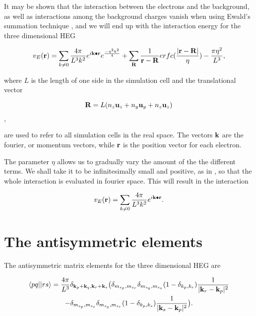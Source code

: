 It may be shown that the interaction between the electrons and the background, as well as interactions among the background charges vanish when using Ewald's summation technique \cite{Fraser1996}, and we will end up with the interaction energy for the three dimensional HEG \cite{Drummond2008}

\begin{equation}
v_{E}(\bold{r}) = \sum_{k \neq 0} \frac{4 \pi}{L^3 k^2 } e^{i \bold{k} \bullet \bold{r}}  e^{\frac{-\eta^2 k^2}{4} } + \sum_\bold{R} \frac{1}{\bold{r}- \bold{R}} erfc(\frac{\vert \bold{r}- \bold{R} \vert }{\eta}) - \frac{\pi \eta^2}{L^3 } ,
\label{eqn:HEG_interaction}
\end{equation}

where $L$ is the length of one side in the simulation cell and the translational vector

$$ \bold{R} = L (n_z \bold{u}_z + n_y \bold{u}_y + n_z \bold{u}_z)$$,

are used to refer to all simulation cells in the real space. The vectors $\bold{k}$ are the fourier, or momentum vectors, while $\bold{r}$ is the position vector for each electron.  \cite{Baardsen2014}

The parameter $\eta$ allows us to gradually vary the amount of the the different terms. We shall take it to be infinitesimally small and positive, as in \cite[p.97]{Baardsen2014}, so that the whole interaction is evaluated in fourier space. This will result in the interaction

\begin{equation}
v_{E}(\bold{r}) = \sum_{k \neq 0} \frac{4 \pi}{L^3 k^2} e^{i \bold{k} \bullet \bold{r}}  .
\label{eqn:HEG_interaction2}
\end{equation}

\section{The antisymmetric elements}

The antisymmetric matrix elements for the three dimensional HEG are \cite{Baardsen2014}

\begin{multline}
\langle pq \vert \vert rs \rangle = \frac{4\pi}{L^3} \delta_{\bold{k}_p + \bold{k}_q , \bold{k}_r + \bold{k}_s} \big{(}  \delta_{m_{s_p}, m_{s_r}}  \delta_{m_{s_q}, m_{s_s}} (1-\delta_{k_p, k_r}) \frac{1}{\vert \bold{k}_r -\bold{k}_p \vert^2 } \\
-\delta_{m_{s_p}, m_{s_s}}  \delta_{m_{s_q}, m_{s_r}} (1-\delta_{k_p, k_s}) \frac{1}{\vert \bold{k}_s -\bold{k}_p \vert^2 } 
 \big{)}.
\end{multline}

